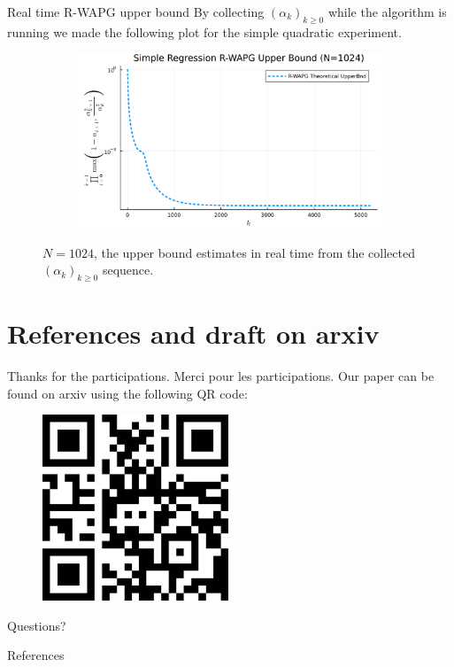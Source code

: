 \documentclass[11pt]{beamer}
\theoremstyle{definition}
\begin{document}
    \begin{frame}{Real time R-WAPG upper bound}
        By collecting $(\alpha_k)_{k \ge 0}$ while the algorithm is running we made the following plot for the simple quadratic experiment. 
        \begin{figure}[H]
            \centering
            \begin{subfigure}[b]{0.75\textwidth}
                \centering
                \includegraphics[width=\textwidth]{
                    assets/simple_regression_rwapg_upperbnd_1024.png
                }
            \end{subfigure}
            \caption{
                $N = 1024$, the upper bound estimates in real time from the collected $(\alpha_k)_{k \ge 0}$ sequence. 
            }
            \label{fig:simple-quadratic-r-wapg-rwapg-upperbnd}
        \end{figure}
    \end{frame} 

\section{References and draft on arxiv}
    \begin{frame}{Thanks for the participations. Merci pour les participations.}
        Our paper can be found on arxiv using the following QR code: 
        \begin{figure}
            \centering
            \includegraphics[width=15em]{assets/paper-qrcode.png}
        \end{figure}
        Questions?
    \end{frame}
    \begin{frame}{References}        
        
    \end{frame}
\end{document}
